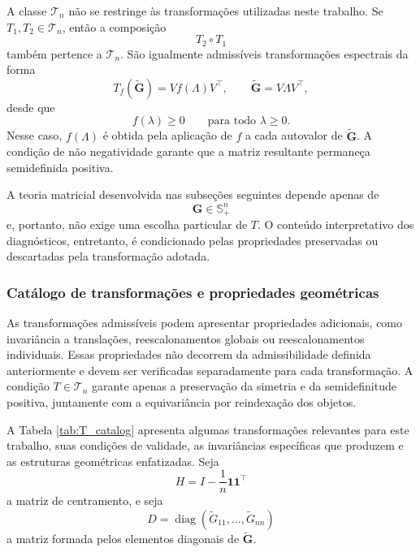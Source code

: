 A classe $\mathcal{T}_n$ não se restringe às transformações utilizadas neste trabalho. Se
$T_1,T_2\in\mathcal{T}_n$,
então a composição
\begin{equation*}
    T_2\circ T_1
\end{equation*}
também pertence a $\mathcal{T}_n$. São igualmente admissíveis transformações espectrais da forma
\begin{equation}\label{eq:spectral_transformation}
    T_f(\widetilde{\mathbf{G}}) = V f(\Lambda)V^\top, \qquad \widetilde{\mathbf{G}} = V\Lambda V^\top,
\end{equation}
desde que
\begin{equation*}
    f(\lambda)\geq 0
    \qquad
    \text{para todo }\lambda\geq 0.
\end{equation*}
Nesse caso, $f(\Lambda)$ é obtida pela aplicação de $f$ a cada autovalor de $\widetilde{\mathbf{G}}$. A condição de não negatividade garante que a matriz resultante permaneça semidefinida positiva.

A teoria matricial desenvolvida nas subseções seguintes depende apenas de
\begin{equation*}
    \mathbf{G}
    \in
    \mathbb{S}_+^n
\end{equation*}
e, portanto, não exige uma escolha particular de $T$. O conteúdo interpretativo dos diagnósticos, entretanto, é condicionado pelas propriedades preservadas ou descartadas pela transformação adotada.

\subsubsection*{Catálogo de transformações e propriedades geométricas}

As transformações admissíveis podem apresentar propriedades adicionais, como invariância a translações, reescalonamentos globais ou reescalonamentos individuais. Essas propriedades não decorrem da admissibilidade definida anteriormente e devem ser verificadas separadamente para cada transformação. A condição $T\in\mathcal{T}_n$ garante apenas a preservação da simetria e da semidefinitude positiva, juntamente com a equivariância por reindexação dos objetos.

A Tabela \ref{tab:T_catalog} apresenta algumas transformações relevantes para este trabalho, suas condições de validade, as invariâncias específicas que produzem e as estruturas geométricas enfatizadas. Seja
\begin{equation}\label{eq:centering_matrix}
    H = I - \frac{1}{n} \mathbf{1}\mathbf{1}^{\top}
\end{equation}
a matriz de centramento, e seja
\begin{equation}\label{eq:gram_diagonal}
    D = \operatorname{diag}
    \left(
        \widetilde{G}_{11},
        \dots,
        \widetilde{G}_{nn}
    \right)
\end{equation}
a matriz formada pelos elementos diagonais de $\widetilde{\mathbf{G}}$.

